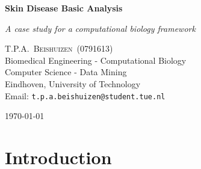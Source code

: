 \documentclass[10pt,a4paper]{article}
\newcommand{\documenttitle}{Skin Disease Basic Analysis}
\newcommand{\documentsubtitle}{A case study for a computational biology framework}
\begin{document}
	
	\begin{titlepage}
		
		\center
		
		\vspace*{3cm}
		
		\textbf{\huge \documenttitle}
		
		\textit{\LARGE \documentsubtitle}
		
		\vspace*{2cm}
		
		\large
		\centering
		T.P.A.~\textsc{Beishuizen}~(0791613)\\
		Biomedical Engineering - Computational Biology\\
		Computer Science - Data Mining\\
		Eindhoven, University of Technology\\
		Email: \texttt{t.p.a.beishuizen@student.tue.nl}
		
		\vfill
		
		\vspace*{1cm}
		
		\today
		
	\end{titlepage}
	
	\tableofcontents
	
	
	\pagestyle{fancy}
	\fancyhead{} %
	\fancyfoot{} %
	\renewcommand{\headrulewidth}{0.4pt}
	\renewcommand{\footrulewidth}{0.4pt}
	
	\fancyhead[L]{\rightmark}
	\fancyfoot[C]{\thepage}
	
	
	\clearpage
	
	\section{Introduction}
	\label{sec:Introduction}
	
\end{document}
